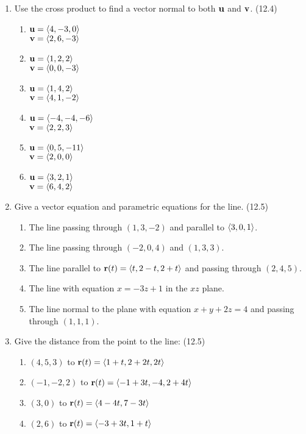 \begin{enumerate}
    \newpage

    \item Use the cross product to find a vector normal to both $\mathbf{u}$ and $\mathbf{v}$. (12.4)

      \begin{enumerate}
        \item $\mathbf{u}=\left<4,-3,0\right>$\\ $\mathbf{v}=\left<2,6,-3\right>$
        \item $\mathbf{u}=\left<1,2,2\right>$\\ $\mathbf{v}=\left<0,0,-3\right>$
        \item $\mathbf{u}=\left<1,4,2\right>$\\ $\mathbf{v}=\left<4,1,-2\right>$
        \item $\mathbf{u}=\left<-4,-4,-6\right>$\\ $\mathbf{v}=\left<2,2,3\right>$
        \item $\mathbf{u}=\left<0,5,-11\right>$\\ $\mathbf{v}=\left<2,0,0\right>$
        \item $\mathbf{u}=\left<3,2,1\right>$\\ $\mathbf{v}=\left<6,4,2\right>$
      \end{enumerate}

    \item Give a vector equation and parametric equations for the line. (12.5)

      \begin{enumerate}
        \item The line passing through $(1,3,-2)$ and parallel to $\left<3,0,1\right>$.
        \item The line passing through $(-2,0,4)$ and $(1,3,3)$.
        \item The line parallel to $\mathbf{r}(t)=\left<t,2-t,2+t\right>$ and passing through $(2,4,5)$.
        \item The line with equation $x=-3z+1$ in the $xz$ plane.
        \item The line normal to the plane with equation $x+y+2z=4$ and passing through $(1,1,1)$.
      \end{enumerate}

    \item Give the distance from the point to the line: (12.5)

      \begin{enumerate}
        \item $(4,5,3)$ to $\mathbf{r}(t) = \left<1+t,2+2t,2t\right>$
        \item $(-1,-2,2)$ to $\mathbf{r}(t) = \left<-1+3t,-4,2+4t\right>$
        \item $(3,0)$ to $\mathbf{r}(t) = \left<4-4t,7-3t\right>$
        \item $(2,6)$ to $\mathbf{r}(t) = \left<-3+3t,1+t\right>$
      \end{enumerate}


\end{enumerate}
